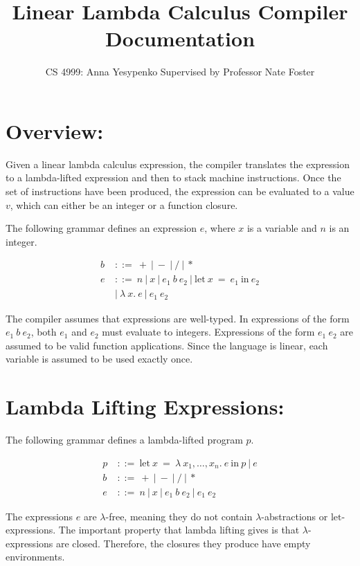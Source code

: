 \documentclass[11pt]{article}
\begin{document}
\title{Linear Lambda Calculus Compiler Documentation}
\author{CS 4999: Anna Yesypenko Supervised by Professor Nate Foster}
\maketitle

\section*{Overview:}

Given a linear lambda calculus expression, the compiler translates the expression to a lambda-lifted expression and then to stack machine instructions. Once the set of instructions have been produced, the expression can be evaluated to a value $v$, which can either be an integer or a function closure.

\medskip
The following grammar defines an expression $e$, where $x$ is a variable and $n$ is an integer.

\begin{align*}
    b\ &::=\ +\ |\ -\ |\ /\ |\ *\\
    e\ &::=\ n\ |\ x\ |\ e_1\ b\ e_2\ |\ \text{let}\ x\ =\ e_1\ \text{in}\ e_2\\
    &|\ \lambda\ x.\ e\ |\ e_1\ e_2
\end{align*}

The compiler assumes that expressions are well-typed. In expressions of the form $e_1\ b\ e_2$, both $e_1$ and $e_2$ must evaluate to integers. Expressions of the form $e_1\ e_2$ are assumed to be valid function applications. Since the language is linear, each variable is assumed to be used exactly once.

\section*{Lambda Lifting Expressions:}

The following grammar defines a lambda-lifted program $p$.

\begin{align*}
    p\ &::=\ \text{let}\ x\ =\ \lambda\ x_1, \ldots, x_n.\ e\ \text{in}\ p\ |\ e\\
    b\ &::=\ +\ |\ -\ |\ /\ |\ *\\
    e\ &::=\ n\ |\ x\ |\ e_1\ b\ e_2\ |\ e_1\ e_2
\end{align*}

The expressions $e$ are $\lambda$-free, meaning they do not contain $\lambda$-abstractions or $\text{let}$-expressions. The important property that lambda lifting gives is that $\lambda$-expressions are closed. Therefore, the closures they produce have empty environments.
\end{document}

